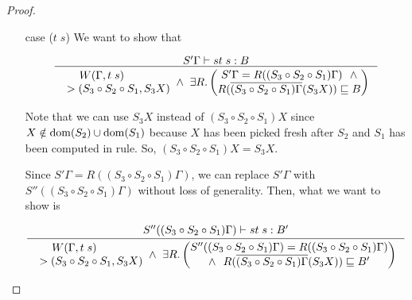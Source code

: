 \begin{proof}
\begin{itemize}
\item[case]($t\;s$)
        We want to show that \vspace*{-2em}
        \begin{singlespace}
        \[\inference{S'\Gamma |-s t\;s : B}{
        \begin{matrix} W(\Gamma,t\;s) ~\qquad~ \\
                ~> (S_3\circ S_2\circ S_1,S_3 X) \end{matrix}
        ~\land~
        \exists R.
                \left(\begin{matrix}
                        S'\Gamma=R((S_3\circ S_2\circ S_1)\Gamma) ~~ \land \\
                        R(\overline{(S_3\circ S_2\circ S_1)\Gamma}(S_3 X))
                        \sqsubseteq B
                \end{matrix}\right) } \]
        \end{singlespace}
        Note that we can use $S_3 X$ instead of $(S_3\circ S_2\circ S_1) X$
        since $X\notin\mathop{\mathrm{dom}}(S_2)\cup\mathop{\mathrm{dom}}(S_1)$ because
        $X$ has been picked fresh after $S_2$ and $S_1$ has been computed
        in  rule. So, $(S_3\circ S_2\circ S_1) X = S_3 X$.
        
        Since $S'\Gamma=R((S_3\circ S_2\circ S_1)\Gamma)$,
        we can replace $S'\Gamma$ with $S''((S_3\circ S_2\circ S_1)\Gamma)$
        without loss of generality. Then, what we want to show is
        \vspace*{-2em}
        \begin{singlespace}
        \begin{equation}
        \inference{S''((S_3\circ S_2\circ S_1)\Gamma) |-s t\;s : B'}{
        \begin{matrix} W(\Gamma,t\;s) ~\qquad~ \\
                ~> (S_3\circ S_2\circ S_1,S_3 X) \end{matrix}
        ~\land~
        \exists R.
        \left(\begin{matrix}
                S''((S_3\circ S_2\circ S_1)\Gamma)=R((S_3\circ S_2\circ S_1)\Gamma)
                \\ \land ~~
                R(\overline{(S_3\circ S_2\circ S_1)\Gamma}(S_3 X)) \sqsubseteq B'
        \end{matrix}\right) }
        \label{WcompleteWhatWeWantToShow}
        \end{equation}
        \end{singlespace}


\end{itemize}
\end{proof}
